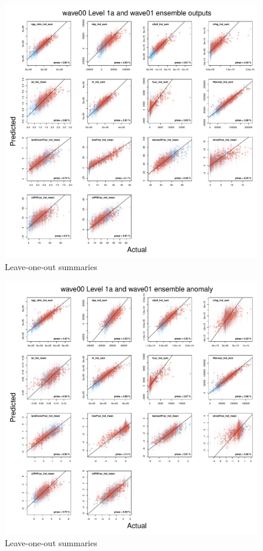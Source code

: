 \documentclass[gmd, manuscript]{copernicus}
\begin{document}
%
\begin{figure}[t]
\includegraphics[width=12cm]{./figs/kmloostats_Y_wave00_level1a_wave01.pdf}
\caption{Leave-one-out summaries }
\label{fig:kmloostats_Y_wave00_level1a_wave01}
\end{figure}


%
\begin{figure}[t]
\includegraphics[width=12cm]{./figs/kmloostats_YAnom_wave00_level1a_wave01.pdf}
\caption{Leave-one-out summaries }
\label{fig:kmloostats_YAnom_wave00_level1a_wave01}
\end{figure}
\end{document}
